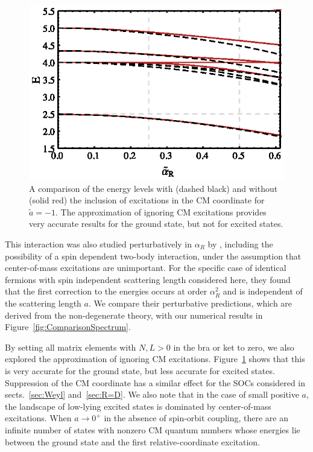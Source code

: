 \documentclass[%
 onecolumn,
 notitlepage,
 amsmath,amssymb,
 aps,
]{revtex4-1}
\begin{document}
\begin{figure}
\includegraphics{Figures/ComparisonNoCM}
\caption{\label{fig:ComparisonSpectrum2} A comparison of the energy levels with (dashed black) and without (solid red) the inclusion of excitations in the CM coordinate for $\tilde{a}=-1$. The approximation of ignoring CM excitations provides very accurate results for the ground state, but not for excited states.} 
\end{figure}


This interaction was also studied perturbatively in $\alpha_R$ by \cite{PhysRevA.89.033606}, including the possibility of a spin dependent two-body interaction, under the assumption that center-of-mass excitations are unimportant. For the specific case of identical fermions with spin independent scattering length considered here, they found that the first correction to the energies occurs at order $\alpha_R^2$ and is independent of the scattering length $a$. We compare their perturbative predictions, which are derived from the non-degenerate theory, with our numerical results in Figure~\ref{fig:ComparisonSpectrum}. 

By setting all matrix elements with $N,L>0$ in the bra or ket to zero, we also explored the approximation of ignoring CM excitations. Figure~\ref{fig:ComparisonSpectrum2} shows that this is very accurate for the ground state, but less accurate for excited states. Suppression of the CM coordinate has a similar effect for the SOCs considered in sects.~\ref{sec:Weyl} and~\ref{sec:R=D}. We also note that in the case of small positive $a$, the landscape of low-lying excited states is dominated by center-of-mass excitations. When $a\rightarrow0^+$ in the absence of spin-orbit coupling, there are an infinite number of states with nonzero CM quantum numbers whose energies lie between the ground state and the first relative-coordinate excitation.
\end{document}
